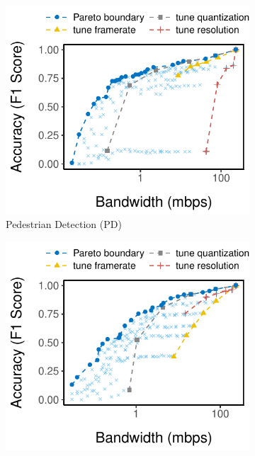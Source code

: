 \begin{figure}[htb]
  \centering
  \begin{subfigure}[t]{0.32\textwidth}
    \centering
    \includegraphics[width=\textwidth]{figures/profile-mot.pdf}
    \caption{Pedestrian Detection (PD)}
    \label{fig:pd-profile}
  \end{subfigure}
  \hfill
  \begin{subfigure}[t]{0.32\textwidth}
    \centering
    \includegraphics[width=\textwidth]{figures/profile-darknet.pdf}

\end{subfigure}
\end{figure}

